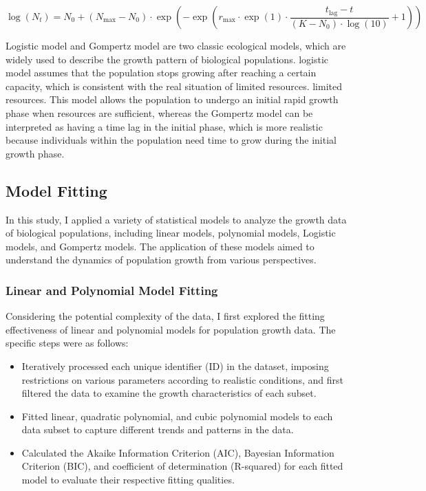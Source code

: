 \documentclass[11pt]{article}
\begin{document}
\begin{equation}
\log(N_t) = N_0 + \left(N_{\text{max}} - N_0 \right) \cdot \exp\left(-\exp\left(r_{\text{max}} \cdot \exp(1) \cdot \frac{t_{\text{lag}} - t}{(K - N_0) \cdot \log(10)} + 1\right)\right)
\end{equation}


Logistic model and Gompertz model are two classic ecological models, which are widely used to describe the growth pattern of biological populations. logistic model assumes that the population stops growing after reaching a certain capacity, which is consistent with the real situation of limited resources. limited resources. This model allows the population to undergo an initial rapid growth phase when resources are sufficient, whereas the Gompertz model can be interpreted as having a time lag in the initial phase, which is more realistic because individuals within the population need time to grow during the initial growth phase.

\subsection{Model Fitting}
In this study, I applied a variety of statistical models to analyze the growth data of biological populations, including linear models, polynomial models, Logistic models, and Gompertz models. The application of these models aimed to understand the dynamics of population growth from various perspectives.

\subsubsection{Linear and Polynomial Model Fitting}
Considering the potential complexity of the data, I first explored the fitting effectiveness of linear and polynomial models for population growth data. The specific steps were as follows:
\begin{itemize}
\item Iteratively processed each unique identifier (ID) in the dataset, imposing restrictions on various parameters according to realistic conditions, and first filtered the data to examine the growth characteristics of each subset.

\item Fitted linear, quadratic polynomial, and cubic polynomial models to each data subset to capture different trends and patterns in the data.
\item Calculated the Akaike Information Criterion (AIC), Bayesian Information Criterion (BIC), and coefficient of determination (R-squared) for each fitted model to evaluate their respective fitting qualities.
\end{itemize}
\end{document}
